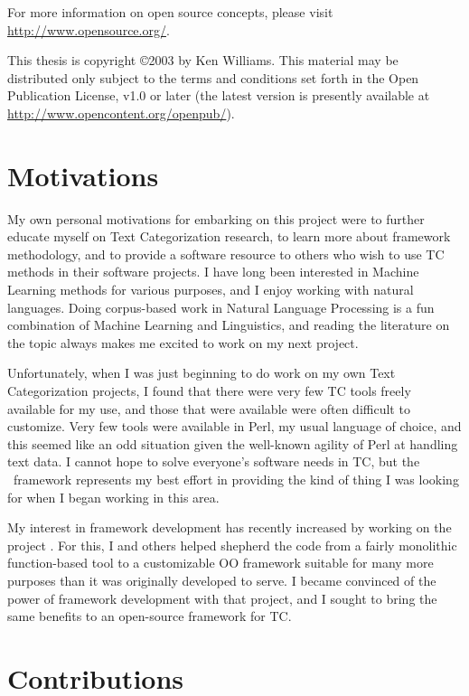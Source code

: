 For more information on open source concepts, please visit
\url{http://www.opensource.org/}.

This thesis is copyright \copyright 2003 by Ken Williams. This
material may be distributed only subject to the terms and conditions
set forth in the Open Publication License, v1.0 or later (the latest
version is presently available at
\url{http://www.opencontent.org/openpub/}).

\section*{Motivations}

My own personal motivations for embarking on this project were to
further educate myself on Text Categorization research, to learn more
about framework methodology, and to provide a software resource to
others who wish to use TC methods in their software projects.  I have
long been interested in Machine Learning methods for various purposes,
and I enjoy working with natural languages.  Doing corpus-based work
in Natural Language Processing is a fun combination of Machine
Learning and Linguistics, and reading the literature on the topic
always makes me excited to work on my next project.

Unfortunately, when I was just beginning to do work on my own Text
Categorization projects, I found that there were very few TC tools
freely available for my use, and those that were available were often
difficult to customize.  Very few tools were available in Perl, my
usual language of choice, and this seemed like an odd situation given
the well-known agility of Perl at handling text data.  I cannot hope
to solve everyone's software needs in TC, but the \aicat\ framework
represents my best effort in providing the kind of thing I was looking
for when I began working in this area.

My interest in framework development has recently increased by working
on the  project \cite{rolsky:02}.  For this, I
and others helped shepherd the code from a fairly monolithic
function-based tool to a customizable OO framework suitable for many
more purposes than it was originally developed to serve.  I became
convinced of the power of framework development with that project, and
I sought to bring the same benefits to an open-source framework for TC.


\section*{Contributions}

